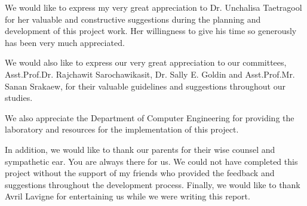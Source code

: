 \documentclass[12pt,oneside,openright,a4paper]{cpe-english-project}
\begin{document}
We would like to express my very great appreciation to Dr. Unchalisa Taetragool for her valuable and constructive suggestions during the planning and development of this project work. Her willingness to give his time so generously has been very much appreciated.

We would also like to express our very great appreciation to our committees, Asst.Prof.Dr. Rajchawit Sarochawikasit, Dr. Sally E. Goldin and Asst.Prof.Mr. Sanan Srakaew, for their valuable guidelines and suggestions throughout our studies.

We also appreciate the Department of Computer Engineering for providing the laboratory and resources for the implementation of this project.

In addition, we would like to thank our parents for their wise counsel and sympathetic ear. You are always there for us. We could not have completed this project without the support of my friends who provided the feedback and suggestions throughout the development process. Finally, we would like to thank Avril Lavigne for entertaining us while we were writing this report.


\tableofcontents                    
\listoftables
\listoffigures                      

\end{document}
